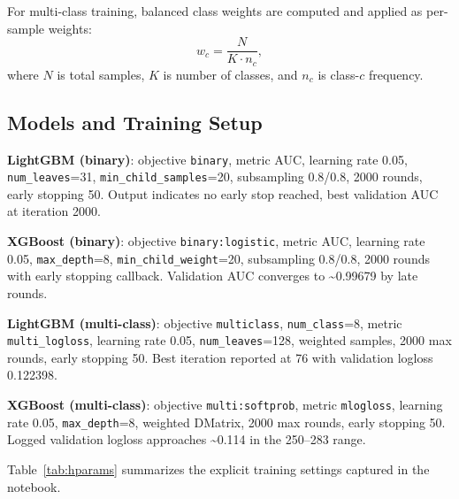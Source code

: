 \documentclass[10pt,journal]{IEEEtran}
\begin{document}
For multi-class training, balanced class weights are computed and applied as per-sample weights:
\begin{equation}
w_c = \frac{N}{K\cdot n_c},
\end{equation}
where $N$ is total samples, $K$ is number of classes, and $n_c$ is class-$c$ frequency.

\subsection{Models and Training Setup}
\textbf{LightGBM (binary)}: objective \texttt{binary}, metric AUC, learning rate 0.05, \texttt{num\_leaves}=31, \texttt{min\_child\_samples}=20, subsampling 0.8/0.8, 2000 rounds, early stopping 50. Output indicates no early stop reached, best validation AUC at iteration 2000.

\textbf{XGBoost (binary)}: objective \texttt{binary:logistic}, metric AUC, learning rate 0.05, \texttt{max\_depth}=8, \texttt{min\_child\_weight}=20, subsampling 0.8/0.8, 2000 rounds with early stopping callback. Validation AUC converges to \textasciitilde0.99679 by late rounds.

\textbf{LightGBM (multi-class)}: objective \texttt{multiclass}, \texttt{num\_class}=8, metric \texttt{multi\_logloss}, learning rate 0.05, \texttt{num\_leaves}=128, weighted samples, 2000 max rounds, early stopping 50. Best iteration reported at 76 with validation logloss 0.122398.

\textbf{XGBoost (multi-class)}: objective \texttt{multi:softprob}, metric \texttt{mlogloss}, learning rate 0.05, \texttt{max\_depth}=8, weighted DMatrix, 2000 max rounds, early stopping 50. Logged validation logloss approaches \textasciitilde0.114 in the 250--283 range.

Table~\ref{tab:hparams} summarizes the explicit training settings captured in the notebook.
\end{document}
